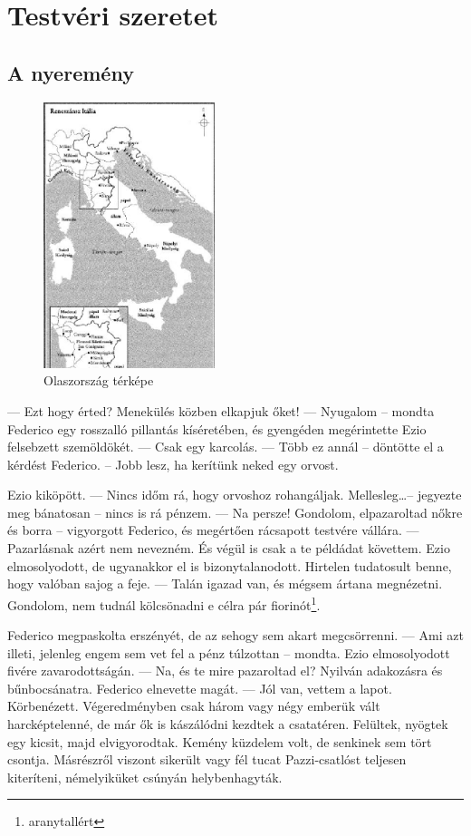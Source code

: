 \documentclass{thesis-ekf}
\theoremstyle{definition}
\theoremstyle{remark}
\begin{document}
\chapter{Testvéri szeretet}\label{2-fej}
\section{A nyeremény}

\begin{figure}[!ht]
    \centering
    \includegraphics[width=5cm]{italy.png}
    \caption{Olaszország térképe}
    \label{abra-olasz}
\end{figure}

— Ezt hogy érted? Menekülés közben elkapjuk őket! 
— Nyugalom -- mondta Federico egy rosszalló pillantás kíséretében, 
és gyengéden megérintette Ezio felsebzett szemöldökét. 
— Csak egy karcolás. 
— Több ez annál -- döntötte el a kérdést Federico. -- Jobb lesz, ha 
kerítünk neked egy orvost. 

Ezio kiköpött. 
— Nincs  időm  rá,  hogy  orvoshoz  rohangáljak.  Mellesleg\dots  -- 
jegyezte meg bánatosan -- nincs is rá pénzem. 
— Na persze! Gondolom, elpazaroltad nőkre és borra -- vigyorgott 
Federico, és megértően rácsapott testvére vállára. — Pazarlásnak azért nem nevezném. És végül is csak a te példádat követtem. 
Ezio elmosolyodott, de ugyanakkor el is bizonytalanodott. Hirtelen 
tudatosult benne, hogy valóban sajog a feje. 
— Talán  igazad  van,  és  mégsem  ártana  megnézetni.  Gondolom, 
nem tudnál kölcsönadni e célra pár fiorinót\footnote{aranytallért}. 

Federico  megpaskolta  erszényét,  de  az  sehogy  sem  akart 
megcsörrenni. 
— Ami azt  illeti,  jelenleg engem  sem  vet fel a pénz túlzottan -- 
mondta. Ezio elmosolyodott fivére zavarodottságán. 
— Na,  és  te  mire  pazaroltad  el?  Nyilván  adakozásra  és 
bűnbocsánatra. Federico elnevette magát. 
— Jól van, vettem a lapot. 
Körbenézett.  Végeredményben  csak  három  vagy  négy  emberük 
vált harcképtelenné, de már ők is kászálódni kezdtek a csatatéren. 
Felültek, nyögtek egy kicsit, majd elvigyorodtak. Kemény küzdelem volt, de senkinek sem tört csontja. Másrészről viszont sikerült vagy 
fél  tucat  Pazzi-csatlóst  teljesen  kiteríteni,  némelyiküket  csúnyán 
helybenhagyták. 
\end{document}
